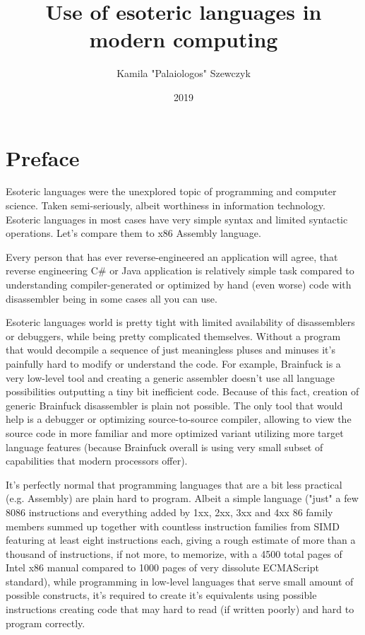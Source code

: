 \documentclass{article}
\title{Use of esoteric languages in modern computing}
\date{2019}
\author{Kamila "Palaiologos" Szewczyk}
\begin{document}
\maketitle

\section{Preface}
\par Esoteric languages were the unexplored topic of programming and computer science. Taken semi-seriously, albeit worthiness in information technology. Esoteric languages in most cases have very simple syntax and limited syntactic operations. Let's compare them to x86 Assembly language.

\par Every person that has ever reverse-engineered an application will agree, that reverse engineering C\# or Java application is relatively simple task compared to understanding compiler-generated or optimized by hand (even worse) code with disassembler being in some cases all you can use.

\par Esoteric languages world is pretty tight with limited availability of disassemblers or debuggers, while being pretty complicated themselves. Without a program that would decompile a sequence of just meaningless pluses and minuses it's painfully hard to modify or understand the code. For example, Brainfuck is a very low-level tool and creating a generic assembler doesn't use all language possibilities outputting a tiny bit inefficient code. Because of this fact, creation of generic Brainfuck disassembler is plain not possible. The only tool that would help is a debugger or optimizing source-to-source compiler, allowing to view the source code in more familiar and more optimized variant utilizing more target language features (because Brainfuck overall is using very small subset of capabilities that modern processors offer).

\par It's perfectly normal that programming languages that are a bit less practical (e.g. Assembly) are plain hard to program. Albeit a simple language ("just" a few 8086 instructions and everything added by 1xx, 2xx, 3xx and 4xx 86 family members summed up together with countless instruction families from SIMD featuring at least eight instructions each, giving a rough estimate of more than a thousand of instructions, if not more, to memorize, with a 4500 total pages of Intel x86 manual compared to 1000 pages of very dissolute ECMAScript standard), while programming in low-level languages that serve small amount of possible constructs, it's required to create it's equivalents using possible instructions creating code that may hard to read (if written poorly) and hard to program correctly.
\end{document}
